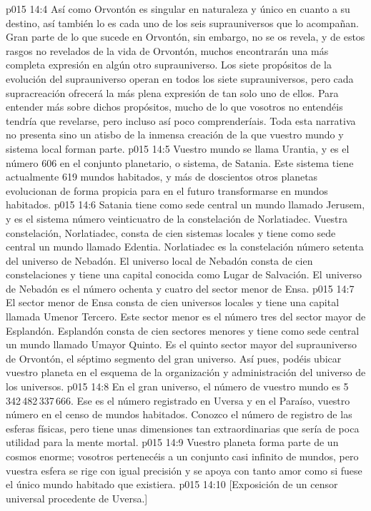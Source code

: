 \vs p015 14:4 Así como Orvontón es singular en naturaleza y único en cuanto a su destino, así también lo es cada uno de los seis suprauniversos que lo acompañan. Gran parte de lo que sucede en Orvontón, sin embargo, no se os revela, y de estos rasgos no revelados de la vida de Orvontón, muchos encontrarán una más completa expresión en algún otro suprauniverso. Los siete propósitos de la evolución del suprauniverso operan en todos los siete suprauniversos, pero cada supracreación ofrecerá la más plena expresión de tan solo uno de ellos. Para entender más sobre dichos propósitos, mucho de lo que vosotros no entendéis tendría que revelarse, pero incluso así poco comprenderíais. Toda esta narrativa no presenta sino un atisbo de la inmensa creación de la que vuestro mundo y sistema local forman parte.
\vs p015 14:5 \pc Vuestro mundo se llama Urantia, y es el número 606 en el conjunto planetario, o sistema, de Satania. Este sistema tiene actualmente 619 mundos habitados, y más de doscientos otros planetas evolucionan de forma propicia para en el futuro transformarse en mundos habitados.
\vs p015 14:6 Satania tiene como sede central un mundo llamado Jerusem, y es el sistema número veinticuatro de la constelación de Norlatiadec. Vuestra constelación, Norlatiadec, consta de cien sistemas locales y tiene como sede central un mundo llamado Edentia. Norlatiadec es la constelación número setenta del universo de Nebadón. El universo local de Nebadón consta de cien constelaciones y tiene una capital conocida como Lugar de Salvación. El universo de Nebadón es el número ochenta y cuatro del sector menor de Ensa.
\vs p015 14:7 El sector menor de Ensa consta de cien universos locales y tiene una capital llamada Umenor Tercero. Este sector menor es el número tres del sector mayor de Esplandón. Esplandón consta de cien sectores menores y tiene como sede central un mundo llamado Umayor Quinto. Es el quinto sector mayor del suprauniverso de Orvontón, el séptimo segmento del gran universo. Así pues, podéis ubicar vuestro planeta en el esquema de la organización y administración del universo de los universos.
\vs p015 14:8 En el gran universo, el número de vuestro mundo es 5\,342\,482\,337\,666. Ese es el número registrado en Uversa y en el Paraíso, vuestro número en el censo de mundos habitados. Conozco el número de registro de las esferas físicas, pero tiene unas dimensiones tan extraordinarias que sería de poca utilidad para la mente mortal.
\vs p015 14:9 \pc Vuestro planeta forma parte de un cosmos enorme; vosotros pertenecéis a un conjunto casi infinito de mundos, pero vuestra esfera se rige con igual precisión y se apoya con tanto amor como si fuese el único mundo habitado que existiera.
\vsetoff
\vs p015 14:10 [Exposición de un censor universal procedente de Uversa.]
